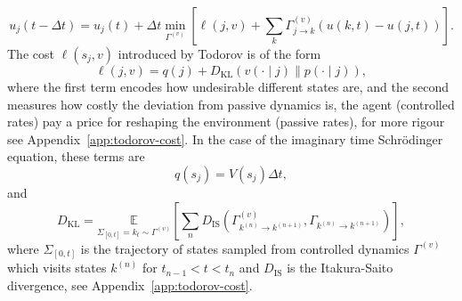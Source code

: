 \begin{equation}
	u_{j}(t-\Delta t)=u_{j}(t)+\Delta t \min _{\Gamma^{(v)}}\left[\ell(j, v)+\sum_{k} \Gamma_{j \rightarrow k}^{(v)}(u(k, t)-u(j, t))\right].
\end{equation}
The cost $\ell(s_j, v)$ introduced by Todorov is of the form
\begin{equation}
	\ell(j, v)=q(j)+D_{\mathrm{KL}}(v(\cdot \mid j) \| p(\cdot \mid j)),
\end{equation}
where the first term encodes how undesirable different states are, and the second measures how costly the deviation from passive dynamics is, the agent (controlled rates) pay a price for reshaping the environment (passive rates), for more rigour see Appendix~\ref{app:todorov-cost}. In the case of the imaginary time Schr\" odinger equation, these terms are
\begin{equation}
	q(s_j)=V(s_j) \Delta t,
\end{equation}
and
\begin{equation}
	D_{\mathrm{KL}}=\underset{\Sigma_{[0, t]} = k_t \sim \Gamma^{(v)}}{\mathbb{E}}\left[\sum_{n} D_{\mathrm{IS}}\left(\Gamma_{k^{(n)} \rightarrow k^{(n+1)}}^{(v)}, \Gamma_{k^{(n)} \rightarrow k^{(n+1)}}\right)\right],
\end{equation}
where $\Sigma_{[0, t]}$ is the trajectory of states sampled from controlled dynamics $\Gamma^{(v)}$  which visits states $k^{(n)}$ for $t_{n-1} < t < t_{n}$ and $D_{\mathrm{IS}}$ is the Itakura-Saito divergence, see Appendix~\ref{app:todorov-cost}.

